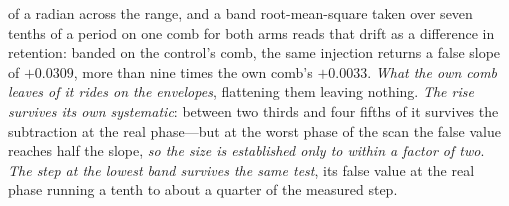 \documentclass[11pt,a4paper]{article}
\theoremstyle{plain}
\theoremstyle{definition}
\theoremstyle{remark}
\begin{document}
of a radian across the range, and a band root-mean-square taken over seven tenths of a period on one comb for
both arms reads that drift as a difference in retention: banded on the control's comb, the same injection
returns a false slope of $+0.0309$, more than nine times the own comb's $+0.0033$. \emph{What the own comb
leaves of it rides on the envelopes}, flattening them leaving nothing. \emph{The rise survives its own
systematic}: between two thirds and four fifths of it survives the subtraction at the real phase---but at the
worst phase of the scan the false value reaches half the slope, \emph{so the size is established only to
within a factor of two}. \emph{The step at the lowest band survives the same test}, its false value at the
real phase running a tenth to about a quarter of the measured
step.
\end{document}
